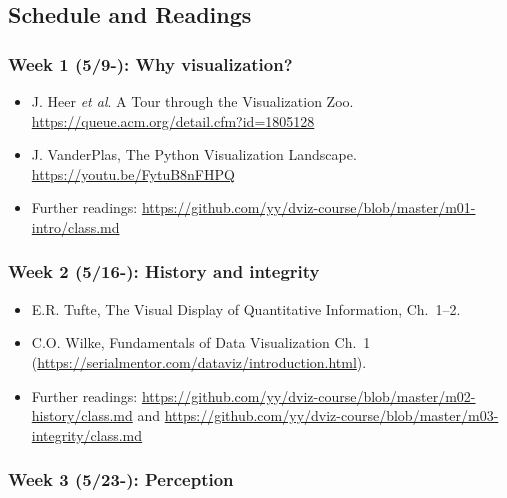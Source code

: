\subsection{Schedule and Readings}\label{sub:schedule}%

\subsubsection{Week 1 (5/9-): Why visualization?} %

\begin{itemize}\itemsep0em 
\item J. Heer \emph{et al}. A Tour through the Visualization Zoo. \url{https://queue.acm.org/detail.cfm?id=1805128}
\item J. VanderPlas, The Python Visualization Landscape. \url{https://youtu.be/FytuB8nFHPQ}
\item Further readings: \url{https://github.com/yy/dviz-course/blob/master/m01-intro/class.md}
\end{itemize}	

\subsubsection{Week 2 (5/16-): History and integrity}%

\begin{itemize}\itemsep0em 
\item E.R. Tufte, The Visual Display of Quantitative Information, Ch.~1--2.
\item C.O. Wilke, Fundamentals of Data Visualization Ch.~1 (\url{https://serialmentor.com/dataviz/introduction.html}). 
\item Further readings: \url{https://github.com/yy/dviz-course/blob/master/m02-history/class.md} and \url{https://github.com/yy/dviz-course/blob/master/m03-integrity/class.md}
\end{itemize}	


\subsubsection{Week 3 (5/23-): Perception}%

